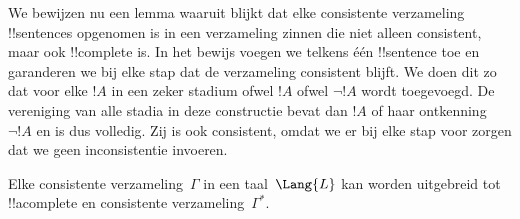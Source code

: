 \documentclass[../../../include/open-logic-section]{subfiles}
\begin{document}
      {}
      {}


\begin{explain}
We bewijzen nu een lemma waaruit blijkt dat elke consistente verzameling
!!{sentence}s opgenomen is in een verzameling zinnen die niet alleen
consistent, maar ook !!{complete} is. In het bewijs voegen we telkens één
!!{sentence} toe en garanderen we bij elke stap dat de verzameling
consistent blijft. We doen dit zo dat voor elke $!A$ in een zeker stadium
ofwel $!A$ ofwel $\lnot !A$ wordt toegevoegd. De vereniging van alle
stadia in deze constructie bevat dan $!A$ of haar ontkenning~$\lnot !A$
en is dus volledig. Zij is ook consistent, omdat we er bij elke stap voor
zorgen dat we geen inconsistentie invoeren.
\end{explain}

\begin{lem}
 Elke consistente verzameling~$\Gamma$ in een
taal~$\Lang{L}$ kan worden uitgebreid tot !!a{complete} en consistente
verzameling~$\Gamma^*$.
\end{lem}
\end{document}
